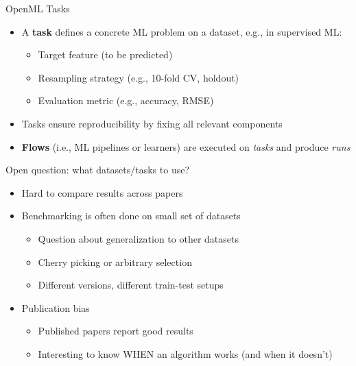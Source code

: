 \documentclass[11pt,compress,t,notes=noshow, xcolor=table]{beamer}
\begin{document}
\begin{vbframe}{OpenML Tasks}

\begin{itemize}
    \item A \textbf{task} defines a concrete ML problem on a dataset, e.g., in supervised ML:
    \begin{itemize}
        \item Target feature (to be predicted)
        \item Resampling strategy (e.g., 10-fold CV, holdout)
        \item Evaluation metric (e.g., accuracy, RMSE)
    \end{itemize}
    \item Tasks ensure reproducibility by fixing all relevant components
    \item \textbf{Flows} (i.e., ML pipelines or learners) are executed on \emph{tasks} and produce \emph{runs}
\end{itemize}
\end{vbframe}

\begin{vbframe}{Open question: what datasets/tasks to use?}
\begin{itemize}
    \item Hard to compare results across papers
    \item Benchmarking is often done on small set of datasets
    \begin{itemize}
        \item Question about generalization to other datasets
        \item Cherry picking or arbitrary selection
        \item Different versions, different train-test setups
    \end{itemize}
    \item Publication bias
    \begin{itemize}
        \item Published papers report good results
        \item Interesting to know WHEN an algorithm works (and when it doesn’t)
    \end{itemize}
\end{itemize}
\end{vbframe}
\end{document}
